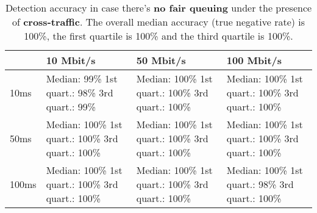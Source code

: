 \documentclass[conference]{IEEEtran}
\begin{document}
\begin{table}
\begin{tabularx}{\columnwidth}{| l | X | X | X |}
\hline
& 10 Mbit/s & 50 Mbit/s & 100 Mbit/s \\ \hline
10ms & Median: 99\% \newline 1st quart.: 98\% \newline 3rd quart.: 99\% & Median: 100\% \newline 1st quart.: 100\% \newline 3rd quart.: 100\% & Median: 100\% \newline 1st quart.: 100\% \newline 3rd quart.: 100\%\\ \hline
50ms & Median: 100\% \newline 1st quart.: 100\% \newline 3rd quart.: 100\% & Median: 100\% \newline 1st quart.: 100\% \newline 3rd quart.: 100\% & Median: 100\% \newline 1st quart.: 100\% \newline 3rd quart.: 100\% \\ \hline
100ms & Median: 100\% \newline 1st quart.: 100\% \newline 3rd quart.: 100\% & Median: 100\% \newline 1st quart.: 100\% \newline 3rd quart.: 100\% & Median: 100\% \newline 1st quart.: 98\% \newline 3rd quart.: 100\% \\ \hline
\end{tabularx}
\caption{Detection accuracy in case there's \textbf{no fair queuing} under the presence of \textbf{cross-traffic}. The overall median accuracy (true negative rate) is 100\%, the first quartile is 100\% and the third quartile is 100\%.}
\label{table:no_fq_crosstraffic}
\end{table}
\end{document}
